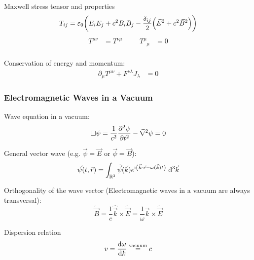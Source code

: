 			\noindent
			Maxwell stress tensor and properties
			\begin{equation}
				T_{ij} = \varepsilon_0 \qty( E_i E_j + c^2 B_i B_j - \frac{\delta_{ij}}{2}\qty(\vec{E}^2 + c^2 \vec{B}^2 ) )
			\end{equation}
			\begin{equation}
				\begin{aligned}
					T^{\mu\nu} &= T^{\nu\mu} &\hspace{20pt}
					T^\mu_{\phantom{\mu}\mu} &= 0 \\
				\end{aligned}
			\end{equation}

			\noindent
			Conservation of energy and momentum:
			\begin{equation}
				\begin{aligned}
					\partial_\mu T^{\mu\nu} + F^{\nu\lambda} J_\lambda &= 0
				\end{aligned}
			\end{equation}


		\subsubsection{Electromagnetic Waves in a Vacuum}
			\noindent
			Wave equation in a vacuum:
			\begin{equation}
				\Box\psi = \frac{1}{c^2} \frac{\partial^2 \psi}{\partial t^2} - \vec{\nabla}^2 \psi = 0
			\end{equation}

			\noindent
			General vector wave (e.g. $\vec{\psi}=\vec{E}$ or $ \vec{\psi}=\vec{B}$):
			\begin{equation}
				\vec{\psi}(t,\vec{r}) = \int_{\mathbb{R}^3} \tilde{\vec{\psi}} (\vec{k}) e^{\mathrm{i}\left(\vec{k}\cdot\vec{r} - \omega(\vec{k})t \right)}\; \dd^3\vec{k}
			\end{equation}

			\noindent
			Orthogonality of the wave vector (Electromagnetic waves in a vacuum are always transversal):
			\begin{equation}
				\tilde{\vec{B}} = \frac{1}{c}\hat{\vec{k}}\times\tilde{\vec{E}} = \frac{1}{\omega}\vec{k}\times\tilde{\vec{E}}
			\end{equation}

			\noindent
			Dispersion relation
			\begin{equation}
				v = \dv{\omega}{k} \stackrel{\text{vacuum}}{=} c
			\end{equation}

